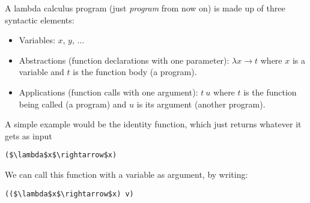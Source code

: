 \documentclass{beamer}
\begin{document}
\begin{frame}[fragile]{\CurrentSection}
\begin{exampleblock}{}
A lambda calculus program (just \textit{program} from now on) is made up of three syntactic elements:
\end{exampleblock}

 
\begin{exampleblock}{}
\begin{itemize}
\item Variables: $x$, $y$, ...
\item Abstractions (function declarations with one parameter): $\lambda x\rightarrow t$ where $x$ is a variable and $t$ is the function body (a program).
\item Applications (function calls with one argument): $t\ u$ where $t$ is the function being called (a program) and $u$ is its argument (another program).

\end{itemize}

\end{exampleblock}

 

\end{frame}

\begin{frame}[fragile]{\CurrentSection}
\begin{exampleblock}{}
A simple example would be the identity function, which just returns whatever it gets as input
\end{exampleblock}

 
\lstset{basicstyle=\ttfamily\small}\lstset{numbers=none}\lstset{language=ML}\begin{lstlisting}
($\lambda$x$\rightarrow$x)
\end{lstlisting}
 

\end{frame}

\begin{frame}[fragile]{\CurrentSection}
\begin{exampleblock}{}
We can call this function with a variable as argument, by writing:
\end{exampleblock}

 
\lstset{basicstyle=\ttfamily\small}\lstset{numbers=none}\lstset{language=ML}\begin{lstlisting}
(($\lambda$x$\rightarrow$x) v)
\end{lstlisting}
 

\end{frame}
\end{document}
